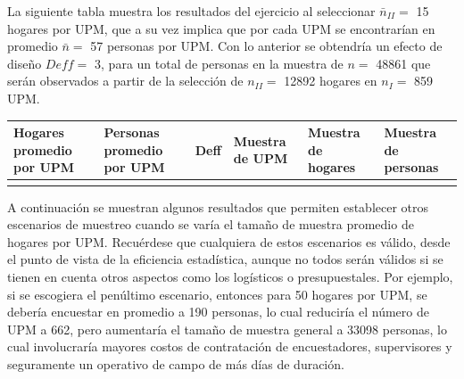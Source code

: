 \documentclass[
  10pt,
  spanish,
]{book}
\begin{document}
La siguiente tabla muestra los resultados del ejercicio al seleccionar \(\bar{n}_{II} =\) 15 hogares por UPM, que a su vez implica que por cada UPM se encontrarían en promedio \(\bar{n}=\) 57 personas por UPM. Con lo anterior se obtendría un efecto de diseño \(Deff =\) 3, para un total de personas en la muestra de \(n =\) 48861 que serán observados a partir de la selección de \(n_{II} =\) 12892 hogares en \(n_{I} =\) 859 UPM.

\begin{longtable}[]{@{}
  >{\centering\arraybackslash}p{}
  >{\centering\arraybackslash}p{}
  >{\centering\arraybackslash}p{}
  >{\centering\arraybackslash}p{}
  >{\centering\arraybackslash}p{}
  >{\centering\arraybackslash}p{}@{}}
\toprule
Hogares promedio por UPM & Personas promedio por UPM & Deff & Muestra de UPM & Muestra de hogares & Muestra de personas \\
\midrule
\endhead
15 & 57 & 3 & 859 & 12892 & 48861 \\
\bottomrule
\end{longtable}

A continuación se muestran algunos resultados que permiten establecer otros escenarios de muestreo cuando se varía el tamaño de muestra promedio de hogares por UPM. Recuérdese que cualquiera de estos escenarios es válido, desde el punto de vista de la eficiencia estadística, aunque no todos serán válidos si se tienen en cuenta otros aspectos como los logísticos o presupuestales. Por ejemplo, si se escogiera el penúltimo escenario, entonces para 50 hogares por UPM, se debería encuestar en promedio a 190 personas, lo cual reduciría el número de UPM a 662, pero aumentaría el tamaño de muestra general a 33098 personas, lo cual involucraría mayores costos de contratación de encuestadores, supervisores y seguramente un operativo de campo de más días de duración.
\end{document}
